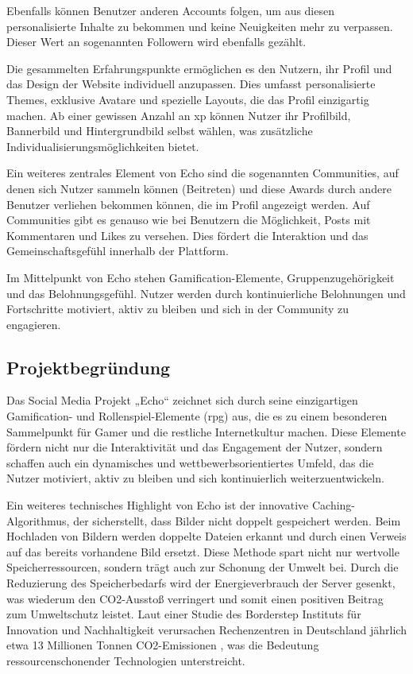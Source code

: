 \documentclass[a4paper,12pt]{article}
\begin{document}
Ebenfalls können Benutzer anderen Accounts folgen, um aus diesen personalisierte Inhalte zu bekommen und keine Neuigkeiten mehr zu verpassen. Dieser Wert an sogenannten Followern wird ebenfalls gezählt.

Die gesammelten Erfahrungspunkte ermöglichen es den Nutzern, ihr Profil und das Design der Website individuell anzupassen. Dies umfasst personalisierte Themes, exklusive Avatare und spezielle Layouts, die das Profil einzigartig machen. Ab einer gewissen Anzahl an \gls{xp} können Nutzer ihr Profilbild, Bannerbild und Hintergrundbild selbst wählen, was zusätzliche Individualisierungsmöglichkeiten bietet.

Ein weiteres zentrales Element von Echo sind die sogenannten Communities, auf denen sich Nutzer sammeln können (Beitreten) und diese Awards durch andere Benutzer verliehen bekommen können, die im Profil angezeigt werden. Auf Communities gibt es genauso wie bei Benutzern die Möglichkeit, Posts mit Kommentaren und Likes zu versehen. Dies fördert die Interaktion und das Gemeinschaftsgefühl innerhalb der Plattform.

Im Mittelpunkt von Echo stehen Gamification-Elemente, Gruppenzugehörigkeit und das Belohnungsgefühl. Nutzer werden durch kontinuierliche Belohnungen und Fortschritte motiviert, aktiv zu bleiben und sich in der Community zu engagieren.

\newpage
\subsection{Projektbegründung}
Das Social Media Projekt „Echo“ zeichnet sich durch seine einzigartigen Gamification- und Rollenspiel-Elemente (\gls{rpg}) aus, die es zu einem besonderen Sammelpunkt für Gamer und die restliche Internetkultur machen. Diese Elemente fördern nicht nur die Interaktivität und das Engagement der Nutzer, sondern schaffen auch ein dynamisches und wettbewerbsorientiertes Umfeld, das die Nutzer motiviert, aktiv zu bleiben und sich kontinuierlich weiterzuentwickeln.

Ein weiteres technisches Highlight von Echo ist der innovative Caching-Algorithmus, der sicherstellt, dass Bilder nicht doppelt gespeichert werden. Beim Hochladen von Bildern werden doppelte Dateien erkannt und durch einen Verweis auf das bereits vorhandene Bild ersetzt. Diese Methode spart nicht nur wertvolle Speicherressourcen, sondern trägt auch zur Schonung der Umwelt bei. Durch die Reduzierung des Speicherbedarfs wird der Energieverbrauch der Server gesenkt, was wiederum den CO2-Ausstoß verringert und somit einen positiven Beitrag zum Umweltschutz leistet. Laut einer Studie des Borderstep Instituts für Innovation und Nachhaltigkeit verursachen Rechenzentren in Deutschland jährlich etwa 13 Millionen Tonnen CO2-Emissionen \cite{borderstep2020}, was die Bedeutung ressourcenschonender Technologien unterstreicht.
\end{document}
